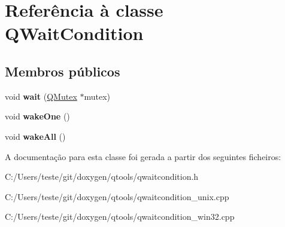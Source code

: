 \hypertarget{class_q_wait_condition}{\section{Referência à classe Q\-Wait\-Condition}
\label{class_q_wait_condition}
}
\subsection*{Membros públicos}
\begin{DoxyCompactItemize}
\item 
\hypertarget{class_q_wait_condition_a93d08ecab3185cc89abbb340a36a23cf}{void {\bfseries wait} (\hyperlink{class_q_mutex}{Q\-Mutex} $\ast$mutex)}\label{class_q_wait_condition_a93d08ecab3185cc89abbb340a36a23cf}

\item 
\hypertarget{class_q_wait_condition_ad1897f7a94e5cb6ffbb1c92b38f1d7a7}{void {\bfseries wake\-One} ()}\label{class_q_wait_condition_ad1897f7a94e5cb6ffbb1c92b38f1d7a7}

\item 
\hypertarget{class_q_wait_condition_aedd92b62e5d2832a9f817c2fa9e97360}{void {\bfseries wake\-All} ()}\label{class_q_wait_condition_aedd92b62e5d2832a9f817c2fa9e97360}

\end{DoxyCompactItemize}


A documentação para esta classe foi gerada a partir dos seguintes ficheiros\-:\begin{DoxyCompactItemize}
\item 
C\-:/\-Users/teste/git/doxygen/qtools/qwaitcondition.\-h\item 
C\-:/\-Users/teste/git/doxygen/qtools/qwaitcondition\-\_\-unix.\-cpp\item 
C\-:/\-Users/teste/git/doxygen/qtools/qwaitcondition\-\_\-win32.\-cpp\end{DoxyCompactItemize}
